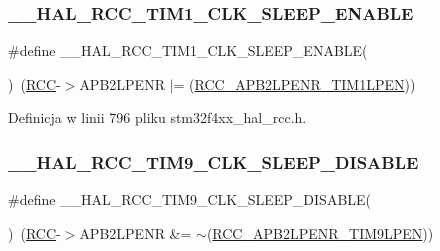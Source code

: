 \subsubsection{\texorpdfstring{\+\_\+\+\_\+\+H\+A\+L\+\_\+\+R\+C\+C\+\_\+\+T\+I\+M1\+\_\+\+C\+L\+K\+\_\+\+S\+L\+E\+E\+P\+\_\+\+E\+N\+A\+B\+LE}{\_\_HAL\_RCC\_TIM1\_CLK\_SLEEP\_ENABLE}}
{\footnotesize\ttfamily \#define \+\_\+\+\_\+\+H\+A\+L\+\_\+\+R\+C\+C\+\_\+\+T\+I\+M1\+\_\+\+C\+L\+K\+\_\+\+S\+L\+E\+E\+P\+\_\+\+E\+N\+A\+B\+LE(\begin{DoxyParamCaption}{ }\end{DoxyParamCaption})~(\hyperlink{group___peripheral__declaration_ga74944438a086975793d26ae48d5882d4}{R\+CC}-\/$>$A\+P\+B2\+L\+P\+E\+NR $\vert$= (\hyperlink{group___peripheral___registers___bits___definition_ga82580245686c32761e8354fb174ba5dd}{R\+C\+C\+\_\+\+A\+P\+B2\+L\+P\+E\+N\+R\+\_\+\+T\+I\+M1\+L\+P\+EN}))}



Definicja w linii 796 pliku stm32f4xx\+\_\+hal\+\_\+rcc.\+h.

\mbox{\label{group___r_c_c___a_p_b2___low_power___enable___disable_ga531cefe824de1fa7461b34030d30d75f}} 
\subsubsection{\texorpdfstring{\+\_\+\+\_\+\+H\+A\+L\+\_\+\+R\+C\+C\+\_\+\+T\+I\+M9\+\_\+\+C\+L\+K\+\_\+\+S\+L\+E\+E\+P\+\_\+\+D\+I\+S\+A\+B\+LE}{\_\_HAL\_RCC\_TIM9\_CLK\_SLEEP\_DISABLE}}
{\footnotesize\ttfamily \#define \+\_\+\+\_\+\+H\+A\+L\+\_\+\+R\+C\+C\+\_\+\+T\+I\+M9\+\_\+\+C\+L\+K\+\_\+\+S\+L\+E\+E\+P\+\_\+\+D\+I\+S\+A\+B\+LE(\begin{DoxyParamCaption}{ }\end{DoxyParamCaption})~(\hyperlink{group___peripheral__declaration_ga74944438a086975793d26ae48d5882d4}{R\+CC}-\/$>$A\+P\+B2\+L\+P\+E\+NR \&= $\sim$(\hyperlink{group___peripheral___registers___bits___definition_ga91b882f3dc2b939a53ed3f4caa537de1}{R\+C\+C\+\_\+\+A\+P\+B2\+L\+P\+E\+N\+R\+\_\+\+T\+I\+M9\+L\+P\+EN}))}



